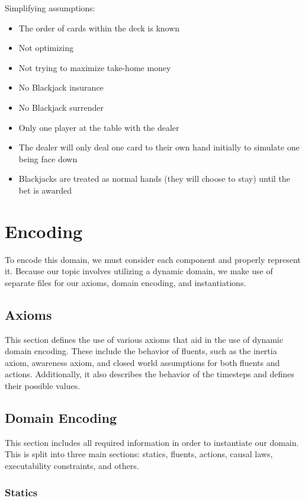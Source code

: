 \documentclass{article}
\begin{document}
Simplifying assumptions:
\begin{itemize}
    \item The order of cards within the deck is known
    \item Not optimizing
    \item Not trying to maximize take-home money
    \item No Blackjack insurance
    \item No Blackjack surrender
    \item Only one player at the table with the dealer
    \item The dealer will only deal one card to their own hand initially to simulate one being face down
    \item Blackjacks are treated as normal hands (they will choose to stay) until the bet is awarded
\end{itemize}

\section{Encoding}

To encode this domain, we must consider each component and properly represent it.
Because our topic involves utilizing a dynamic domain, we make use of separate files for our axioms,
domain encoding, and instantiations.


\subsection{Axioms}

This section defines the use of various axioms that aid in the use of dynamic domain encoding.
These include the behavior of fluents, such as the inertia axiom, awareness axiom, and closed world assumptions for both fluents and actions.
Additionally, it also describes the behavior of the timesteps and defines their possible values.

\subsection{Domain Encoding}

This section includes all required information in order to instantiate our domain.
This is split into three main sections: statics, fluents, actions, causal laws, executability
constraints, and others.

\subsubsection{Statics}
\end{document}
